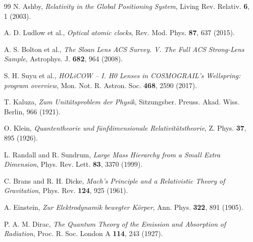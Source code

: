 \begin{thebibliography}{99}
		N. Ashby, \textit{Relativity in the Global Positioning System}, Living Rev. Relativ. \textbf{6}, 1 (2003).
		
		A. D. Ludlow et al., \textit{Optical atomic clocks}, Rev. Mod. Phys. \textbf{87}, 637 (2015).
		
		A. S. Bolton et al., \textit{The Sloan Lens ACS Survey. V. The Full ACS Strong-Lens Sample}, Astrophys. J. \textbf{682}, 964 (2008).
		
		S. H. Suyu et al., \textit{HOLiCOW – I. H0 Lenses in COSMOGRAIL's Wellspring: program overview}, Mon. Not. R. Astron. Soc. \textbf{468}, 2590 (2017).
		
		T. Kaluza, \textit{Zum Unitätsproblem der Physik}, Sitzungsber. Preuss. Akad. Wiss. Berlin, 966 (1921).
		
		O. Klein, \textit{Quantentheorie und fünfdimensionale Relativitätstheorie}, Z. Phys. \textbf{37}, 895 (1926).
		
		L. Randall and R. Sundrum, \textit{Large Mass Hierarchy from a Small Extra Dimension}, Phys. Rev. Lett. \textbf{83}, 3370 (1999).
		
		C. Brans and R. H. Dicke, \textit{Mach's Principle and a Relativistic Theory of Gravitation}, Phys. Rev. \textbf{124}, 925 (1961).
		
		A. Einstein, \textit{Zur Elektrodynamik bewegter Körper}, Ann. Phys. \textbf{322}, 891 (1905).
		
		P. A. M. Dirac, \textit{The Quantum Theory of the Emission and Absorption of Radiation}, Proc. R. Soc. London A \textbf{114}, 243 (1927).
		
	\end{thebibliography}


